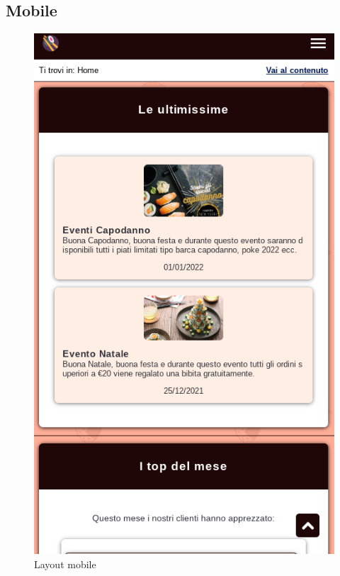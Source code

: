 \documentclass{template}
\begin{document}
	\subsection{Mobile}
	\begin{figure}[H]
		\centering
		\includegraphics[scale=0.6]{src/layout/phone.png}
		\caption{Layout mobile}
	\end{figure}
\end{document}
